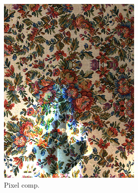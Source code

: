 \begin{figure}[]
\begin{subfigure}{\textwidth}
\begin{subfigure}{0.24\textwidth}
            \includegraphics[width=\textwidth]{images/04-experiment02/human/flowers/pixel_im.jpg}
            \caption*{Pixel comp.}
        \end{subfigure}
        \hfill
        \begin{subfigure}{0.24\textwidth}
            \centering

\end{subfigure}
\end{subfigure}
\end{figure}
